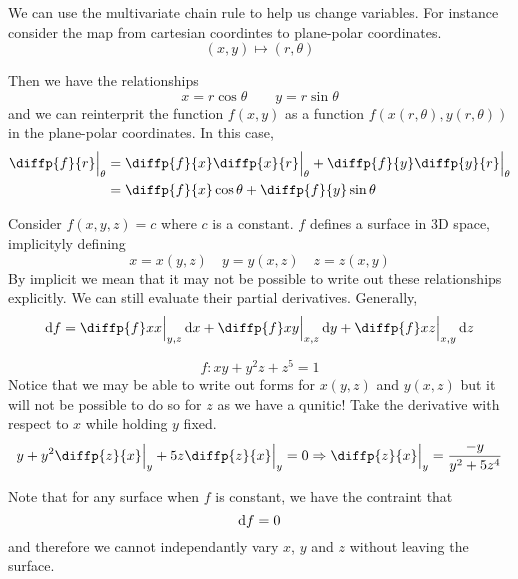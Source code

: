 \documentclass{article}
\begin{document}
We can use the multivariate chain rule to help us change variables. For instance consider the map from cartesian coordintes to plane-polar coordinates.
\[
    (x, y) \mapsto (r, \theta)
\]

Then we have the relationships
\[
    x = r\cos{\theta} \qquad y = r\sin{\theta}
\]
and we can reinterprit the function $f(x, y)$ as a function $f(x(r, \theta), y(r, \theta))$ in the plane-polar coordinates. In this case,
\begin{align*}
    \diffp{f}{r} \Big{|}_{\theta} &= \diffp{f}{x}\diffp{x}{r}\Big{|}_{\theta} + \diffp{f}{y}\diffp{y}{r}\Big{|}_{\theta} \\
    &= \diffp{f}{x}\cos{\theta} + \diffp{f}{y}\sin{\theta}
\end{align*}


\begin{defi}
    Consider $f(x, y, z) = c$ where $c$ is a constant. $f$ defines a surface in 3D space, implicityly defining
    \[
        x = x(y, z) \quad y = y(x, z) \quad z = z(x, y)  
    \]
    By implicit we mean that it may not be possible to write out these relationships explicitly. We can still evaluate their partial derivatives. Generally,
    \[
        \diffd f = \diffp{f}x{x}\Big{|}_{y,z} \diffd x + \diffp{f}x{y}\Big{|}_{x,z} \diffd y + \diffp{f}x{z}\Big{|}_{x,y} \diffd z
    \]
\end{defi}

\begin{eg}
    \[
        f: xy + y^2z + z^5 = 1  
    \]
    Notice that we may be able to write out forms for $x(y, z)$ and $y(x, z)$ but it will not be possible to do so for $z$ as we have a qunitic! Take the derivative with respect to $x$ while holding $y$ fixed.
    \begin{align*}
        y + y^2 \diffp{z}{x}\Big{|}_{y} + 5z \diffp{z}{x}\Big{|}_{y} = 0
        \Rightarrow \diffp{z}{x}\Big{|}_{y} = \frac{-y}{y^2 + 5z^4}
    \end{align*}
\end{eg}

\begin{remark}
    Note that for any surface when $f$ is constant, we have the contraint that
    \[
        \mathop{}\!\mathrm{d} f = 0  
    \]
    and therefore we cannot independantly vary $x$, $y$ and $z$ without leaving the surface.
\end{remark}
\end{document}
